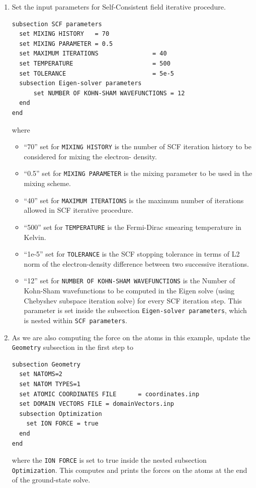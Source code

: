\begin{enumerate}
\item Set the input parameters for Self-Consistent field iterative procedure.
\begin{verbatim}
subsection SCF parameters
  set MIXING HISTORY   = 70
  set MIXING PARAMETER = 0.5
  set MAXIMUM ITERATIONS               = 40
  set TEMPERATURE                      = 500
  set TOLERANCE                        = 5e-5
  subsection Eigen-solver parameters
      set NUMBER OF KOHN-SHAM WAVEFUNCTIONS = 12
  end
end	
\end{verbatim}
where
\begin{itemize}		
\item ``70'' set for \verb|MIXING HISTORY| is the number of SCF iteration history to be considered for mixing the electron-
density.
\item ``0.5'' set for \verb|MIXING PARAMETER| is the mixing parameter to be used in the mixing scheme.
\item ``40'' set for \verb|MAXIMUM ITERATIONS| is the maximum number of iterations allowed in SCF iterative procedure.
\item ``500'' set for \verb|TEMPERATURE| is the Fermi-Dirac smearing temperature in Kelvin.
\item ``1e-5'' set for \verb|TOLERANCE| is the SCF stopping tolerance in terms of L2 norm of the electron-density
difference between two successive iterations.
\item ``12'' set for \verb|NUMBER OF KOHN-SHAM WAVEFUNCTIONS| is the Number of Kohn-Sham wavefunctions to be computed in the Eigen solve (using Chebyshev subspace iteration solve) for every SCF iteration step. This parameter is set inside the subsection \verb|Eigen-solver parameters|, which is nested within \verb|SCF parameters|.
\end{itemize}

\item As we are also computing the force on the atoms in this example, update the \verb|Geometry| subsection in the first step to
\begin{verbatim}
subsection Geometry
  set NATOMS=2
  set NATOM TYPES=1
  set ATOMIC COORDINATES FILE      = coordinates.inp 
  set DOMAIN VECTORS FILE = domainVectors.inp
  subsection Optimization
    set ION FORCE = true
  end
end
\end{verbatim}
where the \verb|ION FORCE| is set to true inside the nested subsection \verb|Optimization|. This computes and prints the forces on the atoms at the end of the ground-state solve.


\end{enumerate}
